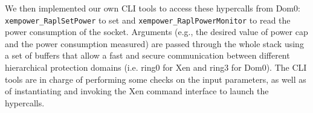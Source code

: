 We then implemented our own \gls{CLI} tools to access these hypercalls from Dom0: \texttt{xempower\_RaplSetPower} to set and \texttt{xempower\_RaplPowerMonitor} to read the power consumption of the socket. Arguments (e.g., the desired value of power cap and the power consumption measured) are passed through the whole stack using a set of buffers that allow a fast and secure communication between different hierarchical protection domains \cite{os-rings} (i.e. ring0 for Xen and ring3 for Dom0).
The \gls{CLI} tools are in charge of performing some checks on the input parameters, as well as of instantiating and invoking the Xen command interface to launch the hypercalls.






